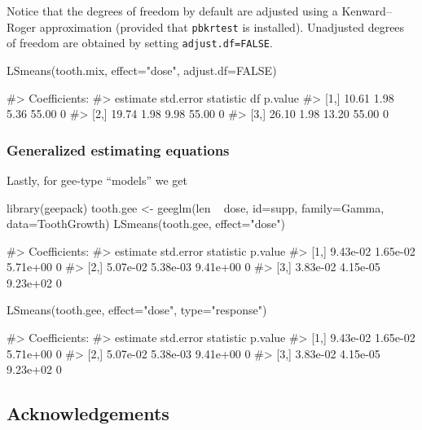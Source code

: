 Notice that the degrees of freedom by default are adjusted using a
Kenward--Roger approximation (provided that \texttt{pbkrtest} is
installed). Unadjusted degrees of freedom are obtained by setting
\verb|adjust.df=FALSE|.

\begin{Schunk}
\begin{Sinput}
LSmeans(tooth.mix, effect="dose", adjust.df=FALSE)
\end{Sinput}
\begin{Soutput}
#> Coefficients:
#>      estimate std.error statistic    df p.value
#> [1,]    10.61      1.98      5.36 55.00       0
#> [2,]    19.74      1.98      9.98 55.00       0
#> [3,]    26.10      1.98     13.20 55.00       0
\end{Soutput}
\end{Schunk}

\hypertarget{generalized-estimating-equations}{%
\subsubsection{Generalized estimating
equations}\label{generalized-estimating-equations}}

Lastly, for gee-type ``models'' we get

\begin{Schunk}
\begin{Sinput}
library(geepack)
tooth.gee <- geeglm(len ~ dose, id=supp, family=Gamma, data=ToothGrowth)
LSmeans(tooth.gee, effect="dose")
\end{Sinput}
\begin{Soutput}
#> Coefficients:
#>      estimate std.error statistic p.value
#> [1,] 9.43e-02  1.65e-02  5.71e+00       0
#> [2,] 5.07e-02  5.38e-03  9.41e+00       0
#> [3,] 3.83e-02  4.15e-05  9.23e+02       0
\end{Soutput}
\begin{Sinput}
LSmeans(tooth.gee, effect="dose", type="response")
\end{Sinput}
\begin{Soutput}
#> Coefficients:
#>      estimate std.error statistic p.value
#> [1,] 9.43e-02  1.65e-02  5.71e+00       0
#> [2,] 5.07e-02  5.38e-03  9.41e+00       0
#> [3,] 3.83e-02  4.15e-05  9.23e+02       0
\end{Soutput}
\end{Schunk}

\hypertarget{acknowledgements}{%
\subsection{Acknowledgements}\label{acknowledgements}}


